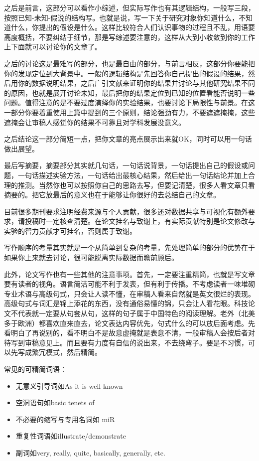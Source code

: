 \documentclass[]{tufte-book}
\providecommand{\tightlist}{%
  \setlength{\itemsep}{0pt}\setlength{\parskip}{0pt}}
\begin{document}
之后是前言，这部分可以看作小综述，但实际写作也有其逻辑结构，一般写三段，按照已知-未知-假说的结构写。也就是说，写一下关于研究对象你知道什么，不知道什么，你提出的假设是什么。这样比较符合人们认识事物的过程且不乱，用语要高度概括，不要纠结于细节，那是写综述要注意的，这样从大到小收敛到你的工作上下面就可以讨论你的文章了。

之后的讨论这是最难写的部分，也是最自由的部分，与前言相反，这部分你要能把你的发现定位到大背景中。一般的逻辑结构是先回答你自己提出的假设的结果，然后用你的数据说明结果，之后广引文献来证明你的结果并讨论与其他研究结果不同的原因，也就是展开讨论未知，最后把你的结果定位到已知的位置看能否说明一些问题。值得注意的是不要过度演绎你的实验结果，也要讨论下局限性与前景。在这一部分你要着重使用上篇中提到的三个原则，结论强劲有力，不要遮遮掩掩，这些遮掩会让审稿人感觉你的结果不可靠且对学科发展没意义。

之后结论这一部分简短一点，把你文章的亮点展示出来就OK，同时可以用一句话做出展望。

最后写摘要，摘要部分其实就几句话，一句话说背景，一句话提出自己的假设或问题，一句话描述实验方法，一句话给出最核心结果，然后给出一句话结论并加上合理的推测。当然你也可以按照你自己的思路去写，但要记清楚，很多人看文章只看摘要的。把它放最后的意义也在于能够让你很好的去总结自己的文章。

目前很多期刊要求注明经费来源与个人贡献，很多还对数据共享与可视化有额外要求，请投稿时一定核查清楚。在论文挂名与致谢上，有实际贡献特别是论文修改与实验的智力贡献才可挂名，否则属于致谢。

写作顺序的考量其实就是一个从简单到复杂的考量，先处理简单的部分的优势在于如果你上来就去讨论，很可能脱离实际数据而瞻前顾后。

此外，论文写作也有一些其他的注意事项。首先，一定要注重精简，也就是写文章要有读者的视角。语言简洁可能不利于发表，但有利于传播。不考虑读者一味堆砌专业术语与高级句式，只会让人读不懂，在审稿人看来自然就是英文很烂的表现。高级句式与词汇是锦上添花的东西，没有通俗易懂的锦，只会让人看花眼。科技论文不代表就一定要从句套从句，这样的句子属于中国特色的阅读理解。老外（北美多于欧洲）都喜欢直来直去，论文表达内容优先，句式什么的可以放后面考虑。先看明白了再说别的，看不明白不是故意虚掩就是表意不清，一般审稿人会按后者对待写到审稿意见上。而且要有力度有自信的说出来，不去绕弯子。要是不习惯，可以先写成繁冗模式，然后精简。

常见的可精简词语：

\begin{itemize}
\tightlist
\item
  无意义引导词如As it is well known
\item
  空洞语句如basic tenets of
\item
  不必要的缩写与专用名词如 miR
\item
  重复性词语如illustrate/demonstrate
\item
  副词如very, really, quite, basically, generally, etc.
\end{itemize}
\end{document}
